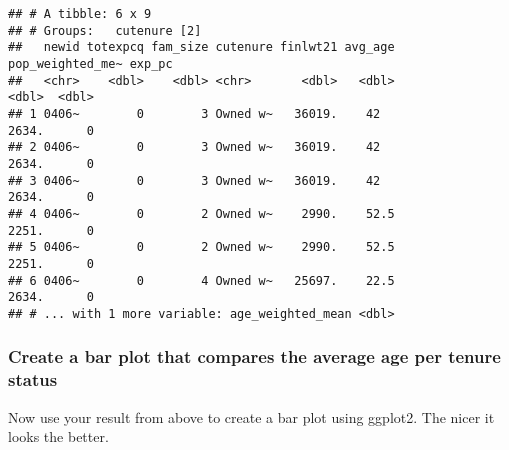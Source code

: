 \documentclass[
]{article}
\newenvironment{Shaded}{\begin{snugshade}}{\end{snugshade}}
\newcommand{\DataTypeTok}[1]{\textcolor[rgb]{0.13,0.29,0.53}{#1}}
\newcommand{\DecValTok}[1]{\textcolor[rgb]{0.00,0.00,0.81}{#1}}
\newcommand{\KeywordTok}[1]{\textcolor[rgb]{0.13,0.29,0.53}{\textbf{#1}}}
\newcommand{\NormalTok}[1]{#1}
\newcommand{\OperatorTok}[1]{\textcolor[rgb]{0.81,0.36,0.00}{\textbf{#1}}}
\newcommand{\StringTok}[1]{\textcolor[rgb]{0.31,0.60,0.02}{#1}}
\begin{document}
\begin{verbatim}
## # A tibble: 6 x 9
## # Groups:   cutenure [2]
##   newid totexpcq fam_size cutenure finlwt21 avg_age pop_weighted_me~ exp_pc
##   <chr>    <dbl>    <dbl> <chr>       <dbl>   <dbl>            <dbl>  <dbl>
## 1 0406~        0        3 Owned w~   36019.    42              2634.      0
## 2 0406~        0        3 Owned w~   36019.    42              2634.      0
## 3 0406~        0        3 Owned w~   36019.    42              2634.      0
## 4 0406~        0        2 Owned w~    2990.    52.5            2251.      0
## 5 0406~        0        2 Owned w~    2990.    52.5            2251.      0
## 6 0406~        0        4 Owned w~   25697.    22.5            2634.      0
## # ... with 1 more variable: age_weighted_mean <dbl>
\end{verbatim}

\hypertarget{create-a-bar-plot-that-compares-the-average-age-per-tenure-status}{%
\subsubsection{Create a bar plot that compares the average age per
tenure
status}\label{create-a-bar-plot-that-compares-the-average-age-per-tenure-status}}

Now use your result from above to create a bar plot using ggplot2. The
nicer it looks the better.

\begin{Shaded}
\end{Shaded}
\end{document}
